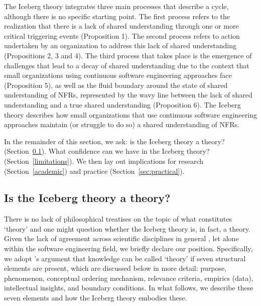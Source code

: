 \documentclass[smallextended]{svjour3}
\begin{document}
The Iceberg theory integrates three main processes that describe a cycle, although there is no specific starting point. 
The first process refers to the realization that there is a lack of shared understanding through one or more critical triggering events (Proposition 1). 
The second process refers to action undertaken by an organization to address this lack of shared understanding (Propositions 2, 3 and 4). 
The third process that takes place is the emergence of challenges that lead to a decay of shared understanding due to the context that small organizations using continuous software engineering approaches face (Proposition 5), as well as the fluid boundary around the state of shared understanding of NFRs, represented by the wavy line between the lack of shared understanding and a true shared understanding (Proposition 6).
The Iceberg theory describes how small organizations that use continuous software engineering approaches maintain (or struggle to do so) a shared understanding of NFRs. 

In the remainder of this section, we ask: is the Iceberg theory a theory? (Section~\ref{sec:sandberg}). What confidence can we have in the Iceberg theory? (Section~\ref{limitations}). We then lay out implications for research (Section~\ref{academic}) and practice (Section~\ref{sec:practical}). 


\subsection{Is the Iceberg theory a theory?}
\label{sec:sandberg}

There is no lack of philosophical treatises on the topic of what constitutes `theory' and one might question whether the Iceberg theory is, in fact, a theory. Given the lack of agreement across scientific disciplines in general \citep{sandberg2021meanings,stol2024theorizing,mintzberg2017developing}, let alone within the software engineering field, we briefly declare our position. 
Specifically, we adopt \cite{sandberg2021meanings}'s argument that knowledge can be called `theory' if seven structural elements are present, which are discussed below in more detail: purpose, phenomenon, conceptual ordering mechanism, relevance criteria, empirics (data), intellectual insights, and boundary conditions. In what follows, we describe these seven elements and how the Iceberg theory embodies these.
\end{document}
